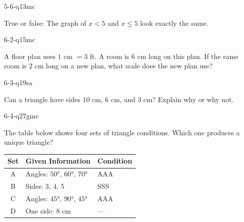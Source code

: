\begin{practiceQuestion}{5-6-q13}{mc}
\begin{questionText}
True or false: The graph of $x < 5$ and $x \leq 5$ look exactly the same.
\end{questionText}
\end{practiceQuestion}

\begin{practiceQuestion}{6-2-q15}{mc}
\begin{questionText}
A floor plan uses $1$ cm $= 3$ ft. A room is $6$ cm long on this plan. If the same room is $2$ cm long on a new plan, what scale does the new plan use?
\end{questionText}
\end{practiceQuestion}

\begin{practiceQuestion}{6-3-q19}{sa}
\begin{questionText}
Can a triangle have sides $10$ cm, $6$ cm, and $3$ cm? Explain why or why not.
\end{questionText}
\end{practiceQuestion}

\begin{practiceQuestion}{6-4-q27}{gmc}
\begin{questionText}
The table below shows four sets of triangle conditions. Which one produces a unique triangle?

\begin{center}
\begin{tabular}{|c|l|l|}
\hline
\textbf{Set} & \textbf{Given Information} & \textbf{Condition} \\
\hline
A & Angles: $50°$, $60°$, $70°$ & AAA \\
\hline
B & Sides: $3$, $4$, $5$ & SSS \\
\hline
C & Angles: $45°$, $90°$, $45°$ & AAA \\
\hline
D & One side: $8$ cm & --- \\
\hline
\end{tabular}
\end{center}
\end{questionText}
\end{practiceQuestion}

